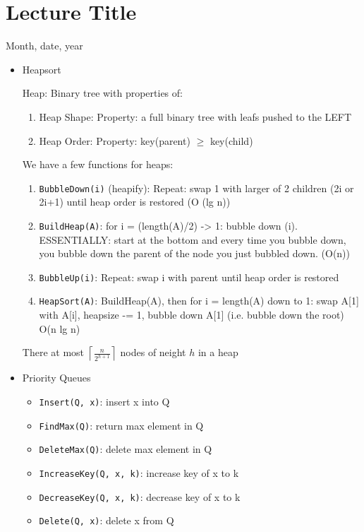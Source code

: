 \section{Lecture Title}
Month, date, year
\begin{itemize}
	\item Heapsort
		\begin{theorem}
			Heap: Binary tree with properties of:
			\begin{enumerate}
				\item Heap Shape: Property: a full binary tree with leafs pushed to the LEFT
				\item Heap Order: Property: key(parent) $\geq$ key(child)
			\end{enumerate}
			We have a few functions for heaps:
			\begin{enumerate}
				\item \texttt{BubbleDown(i)} (heapify): Repeat: swap 1 with larger of 2 children (2i or 2i+1) until heap order is restored (O (lg n))
				\item \texttt{BuildHeap(A)}: for i = (length(A)/2) -> 1: bubble down (i). ESSENTIALLY: start at the bottom and every time you bubble down, you bubble down the parent of the node you just bubbled down. (O(n))
				\item \texttt{BubbleUp(i)}: Repeat: swap i with parent until heap order is restored
				\item \texttt{HeapSort(A)}: BuildHeap(A), then for i = length(A) down to 1: swap A[1] with A[i], heapsize -= 1, bubble down A[1] (i.e. bubble down the root) O(n lg n)
					\end{enumerate}
				\end{theorem}
				\begin{lemma}
					There at most $\left\lceil \frac{n}{2^{h+1}} \right\rceil $ nodes of neight $h$ in a heap
				\end{lemma}
			\item Priority Queues
				\begin{itemize}
					\item \texttt{Insert(Q, x)}: insert x into Q
					\item \texttt{FindMax(Q)}: return max element in Q
					\item \texttt{DeleteMax(Q)}: delete max element in Q
					\item \texttt{IncreaseKey(Q, x, k)}: increase key of x to k
					\item \texttt{DecreaseKey(Q, x, k)}: decrease key of x to k
					\item \texttt{Delete(Q, x)}: delete x from Q
				\end{itemize}
			
\end{itemize}
